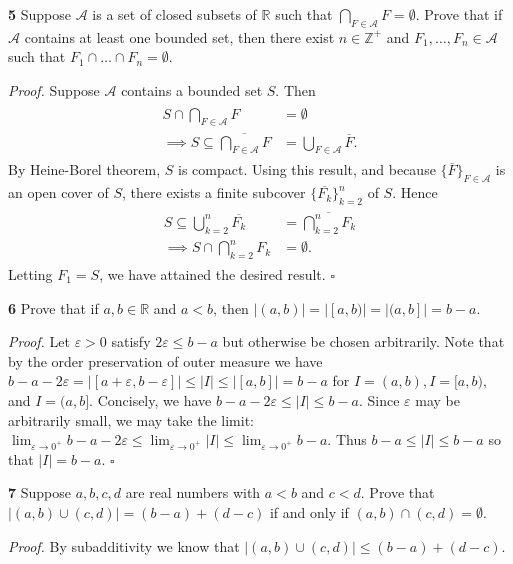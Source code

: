 \documentclass[a4paper]{article}
\newcommand{\R}{\mathbb{R}}
\newcommand{\Z}{\mathbb{Z}}
\begin{document}
\textbf{5} Suppose $\mathcal{A}$ is a set of closed subsets of $\R$ such that $\bigcap_{F \in \mathcal{A}} F = \emptyset$. Prove that if $\mathcal{A}$ contains at least one bounded set, then there exist $n \in \Z^+$ and $F_1, \ldots, F_n \in \mathcal{A}$ such that $F_1 \cap \ldots \cap F_n = \emptyset$.

\emph{Proof.} Suppose $\mathcal{A}$ contains a bounded set $S$. Then
\begin{align}
\begin{split}
    S \cap \bigcap_{F \in \mathcal{A}} F &= \emptyset \\
    \implies S \subseteq \overline{\bigcap_{F \in \mathcal{A}} F} &= \bigcup_{F \in \mathcal{A}} \overline{F}.
\end{split}
\end{align}
By Heine-Borel theorem, $S$ is compact. Using this result, and because $\{\overline{F}\}_{F \in \mathcal{A}}$ is an open cover of $S$, there exists a finite subcover $\{\overline{F_k}\}_{k=2}^n$ of $S$. Hence
\begin{align}
\begin{split}
    S \subseteq \bigcup_{k=2}^n \overline{F_k} &= \overline{\bigcap_{k=2}^n F_k} \\
    \implies S \cap \bigcap_{k=2}^n F_k &= \emptyset.
\end{split}
\end{align}
Letting $F_1 = S$, we have attained the desired result. $\square$

\textbf{6} Prove that if $a, b \in \R$ and $a < b$, then $|(a, b)| = |[a, b)| = |(a, b]| = b - a$.

\emph{Proof.} Let $\varepsilon > 0$ satisfy $2\varepsilon \leq b - a$ but otherwise be chosen arbitrarily. Note that by the order preservation of outer measure we have $b - a - 2\varepsilon = |[a + \varepsilon, b - \varepsilon]| \leq |I| \leq |[a, b]| = b - a$ for $I = (a, b), I = [a, b),$ and $I = (a, b]$. Concisely, we have $b - a - 2\varepsilon \leq |I| \leq b - a$. Since $\varepsilon$ may be arbitrarily small, we may take the limit: $\displaystyle \lim_{\varepsilon \to 0^+} b - a - 2\varepsilon \leq \lim_{\varepsilon \to 0^+} |I| \leq \lim_{\varepsilon \to 0^+} b - a$. Thus $b - a \leq |I| \leq b - a$ so that $|I| = b - a$. $\square$

\textbf{7} Suppose $a, b, c, d$ are real numbers with $a < b$ and $c < d$. Prove that $|(a, b) \cup (c, d)| = (b - a) + (d - c)$ if and only if $(a, b) \cap (c, d) = \emptyset$.

\emph{Proof.} By subadditivity we know that $|(a, b) \cup (c, d)| \leq (b - a) + (d - c)$.
\end{document}
